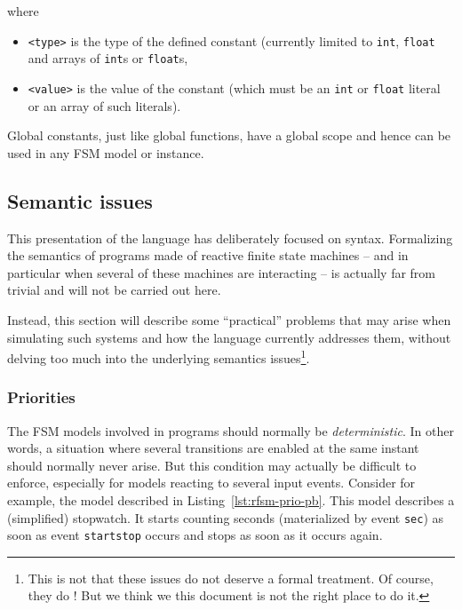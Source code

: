 \noindent
where
\begin{itemize}
\item \lstinline[language=Rfsm]|<type>| is the type of the defined constant (currently limited to
  \verb|int|, \verb|float| and arrays of \verb|int|s or \verb|float|s,
\item \lstinline[language=Rfsm]|<value>| is the value of the constant (which must be an \verb|int|
  or \verb|float| literal or an array of such literals).
\end{itemize}

Global constants, just like global functions, have a global scope and hence can be used in any FSM
model or instance.

\subsection{Semantic issues}
\label{sec:semantic-issues}

This presentation of the language has deliberately focused on syntax. Formalizing the semantics of programs made of
reactive finite state machines -- and in particular when several of these machines are interacting
-- is actually far from trivial and will not be carried out here. 

Instead, this section will describe some ``practical'' problems that may arise when simulating such
systems and how the language currently addresses them, without delving too much into the underlying
semantics issues\footnote{This is not that these issues do not deserve a formal treatment. Of
  course, they do ! But we think we this document is not the right place to do it.}.

\subsubsection{Priorities}
\label{sec:priorities}

The FSM models involved in programs should normally be \emph{deterministic}. In other words, a
situation where several transitions are enabled at the same instant should normally never arise. But
this condition may actually be difficult to enforce, especially for models reacting to several input
events. Consider for example, the model described in Listing~\ref{lst:rfsm-prio-pb}. This model
describes a (simplified) stopwatch. It starts counting seconds (materialized by event \verb|sec|)
as soon as event \verb|startstop| occurs and stops as soon as it occurs again.

